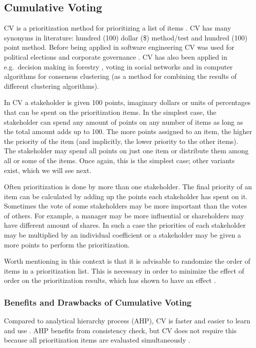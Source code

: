 \subsection{Cumulative Voting\label{app:CV}}

CV is a prioritization method for prioritizing a list of items \cite{Leffingwell1999}.
CV has many synonyms in literature: hundred (100) dollar (\$) method\slash test and hundred (100) point method.
Before being applied in software engineering CV was used for
political elections \cite{Engstrom1999} and corporate governance \cite{Bhagat1984}. 
CV has also been applied in e.g.\ decision making in forestry \cite{Hiltunen2008}, voting in social 
networks \cite{Boldi:2009:VSN:1645953.1646052} and in computer algorithms for consensus 
clustering \cite{Ayad2008b} (as a method for combining the results of different clustering algorithms).

In CV a stakeholder is given 100 points,
imaginary dollars or units of percentages that can be spent on the prioritization
items. In the simplest case, the stakeholder can spend any amount of points on any number
of items as long as the total amount adds up to 100. The more points
assigned to an item, the higher the priority of the item (and implicitly, 
the lower priority to the other items). 
The stakeholder may spend all points on just one item or distribute
them among all or some of the items. Once again, this is the simplest case; 
other variants exist, which we will see next.

Often prioritization is done by more than one stakeholder. The final
priority of an item can be calculated by adding up the points each stakeholder
has spent on it. Sometimes the vote of some stakeholders may be more
important than the votes of others. For example, a manager may be
more influential or shareholders may have different
amount of shares. In such a case the priorities of each stakeholder
may be multiplied by an individual coefficient or a stakeholder may be given a 
more points to perform the prioritization.

Worth mentioning in this context is that it is advisable to randomize 
the order of items in a prioritization list. This is necessary in order 
to minimize the effect of order on the prioritization
results, which has shown to have an effect \cite{Svahnberg2009}.

\subsubsection{Benefits and Drawbacks of Cumulative Voting}
Compared to analytical hierarchy process (AHP), CV is faster and easier to 
learn and use \cite{Berander2005,Ahl2005}.
AHP benefits from consistency check, but CV does not require this because
all prioritization items are evaluated simultaneously \cite{Ahl2005}.

